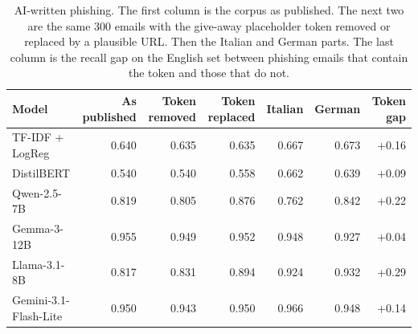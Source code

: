 \begin{table}[t]
\caption{AI-written phishing. The first column is the corpus as published. The next two are the same 300 emails with the give-away placeholder token removed or replaced by a plausible URL. Then the Italian and German parts. The last column is the recall gap on the English set between phishing emails that contain the token and those that do not.}
\label{tab:aiphish}
\centering\footnotesize
\setlength{\tabcolsep}{3pt}
\begin{tabular}{lrrrrrr}
\toprule
Model & As published & Token removed & Token replaced & Italian & German & Token gap \\
\midrule
TF-IDF + LogReg & 0.640 & 0.635 & 0.635 & 0.667 & 0.673 & +0.16 \\
DistilBERT & 0.540 & 0.540 & 0.558 & 0.662 & 0.639 & +0.09 \\
Qwen-2.5-7B & 0.819 & 0.805 & 0.876 & 0.762 & 0.842 & +0.22 \\
Gemma-3-12B & 0.955 & 0.949 & 0.952 & 0.948 & 0.927 & +0.04 \\
Llama-3.1-8B & 0.817 & 0.831 & 0.894 & 0.924 & 0.932 & +0.29 \\
Gemini-3.1-Flash-Lite & 0.950 & 0.943 & 0.950 & 0.966 & 0.948 & +0.14 \\
\bottomrule
\end{tabular}
\end{table}
